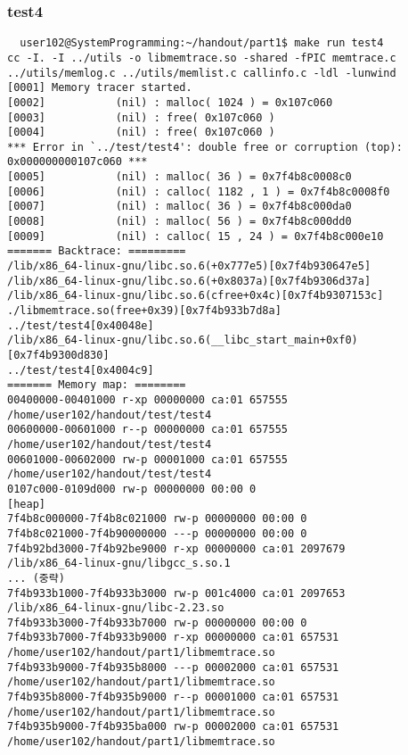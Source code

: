\documentclass{report}
\begin{document}
\subsubsection{test4}
\begin{verbatim}
  user102@SystemProgramming:~/handout/part1$ make run test4
cc -I. -I ../utils -o libmemtrace.so -shared -fPIC memtrace.c ../utils/memlog.c ../utils/memlist.c callinfo.c -ldl -lunwind
[0001] Memory tracer started.
[0002]           (nil) : malloc( 1024 ) = 0x107c060
[0003]           (nil) : free( 0x107c060 )
[0004]           (nil) : free( 0x107c060 )
*** Error in `../test/test4': double free or corruption (top): 0x000000000107c060 ***
[0005]           (nil) : malloc( 36 ) = 0x7f4b8c0008c0
[0006]           (nil) : calloc( 1182 , 1 ) = 0x7f4b8c0008f0
[0007]           (nil) : malloc( 36 ) = 0x7f4b8c000da0
[0008]           (nil) : malloc( 56 ) = 0x7f4b8c000dd0
[0009]           (nil) : calloc( 15 , 24 ) = 0x7f4b8c000e10
======= Backtrace: =========
/lib/x86_64-linux-gnu/libc.so.6(+0x777e5)[0x7f4b930647e5]
/lib/x86_64-linux-gnu/libc.so.6(+0x8037a)[0x7f4b9306d37a]
/lib/x86_64-linux-gnu/libc.so.6(cfree+0x4c)[0x7f4b9307153c]
./libmemtrace.so(free+0x39)[0x7f4b933b7d8a]
../test/test4[0x40048e]
/lib/x86_64-linux-gnu/libc.so.6(__libc_start_main+0xf0)[0x7f4b9300d830]
../test/test4[0x4004c9]
======= Memory map: ========
00400000-00401000 r-xp 00000000 ca:01 657555                             /home/user102/handout/test/test4
00600000-00601000 r--p 00000000 ca:01 657555                             /home/user102/handout/test/test4
00601000-00602000 rw-p 00001000 ca:01 657555                             /home/user102/handout/test/test4
0107c000-0109d000 rw-p 00000000 00:00 0                                  [heap]
7f4b8c000000-7f4b8c021000 rw-p 00000000 00:00 0
7f4b8c021000-7f4b90000000 ---p 00000000 00:00 0
7f4b92bd3000-7f4b92be9000 r-xp 00000000 ca:01 2097679                    /lib/x86_64-linux-gnu/libgcc_s.so.1
... (중략)
7f4b933b1000-7f4b933b3000 rw-p 001c4000 ca:01 2097653                    /lib/x86_64-linux-gnu/libc-2.23.so
7f4b933b3000-7f4b933b7000 rw-p 00000000 00:00 0
7f4b933b7000-7f4b933b9000 r-xp 00000000 ca:01 657531                     /home/user102/handout/part1/libmemtrace.so
7f4b933b9000-7f4b935b8000 ---p 00002000 ca:01 657531                     /home/user102/handout/part1/libmemtrace.so
7f4b935b8000-7f4b935b9000 r--p 00001000 ca:01 657531                     /home/user102/handout/part1/libmemtrace.so
7f4b935b9000-7f4b935ba000 rw-p 00002000 ca:01 657531                     /home/user102/handout/part1/libmemtrace.so

\end{verbatim}
\end{document}
